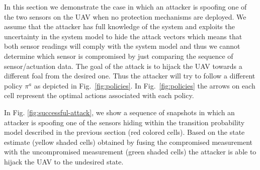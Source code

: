 \documentclass[letterpaper, 10 pt, conference]{ieeeconf}  %
\begin{document}
In this section we demonstrate the case in which an attacker is spoofing one of the two sensors on the UAV when no protection mechanisms are deployed. We assume that the attacker has full knowledge of the system and exploits the uncertainty in the system model to hide the attack vectors which means that both sensor readings will comply with the system model and thus we cannot determine which sensor is compromised by just comparing the sequence of sensor/actuation data. The goal of the attack is to hijack the UAV towards a different foal from the desired one. Thus the attacker will try to follow a different policy $\pi^a$ as depicted in Fig.~\ref{fig:policies}. In Fig.~\ref{fig:policies} the arrows on each cell represent the optimal actions associated with each policy.

In Fig. \ref{fig:successful-attack}, we show a sequence of snapshots in which an attacker is spoofing one of the sensors hiding within the transition probability model described in the previous section (red colored cells). Based on the state estimate (yellow shaded cells) obtained by fusing the compromised measurement with the uncompromised measurement (green shaded cells) the attacker is able to hijack the UAV to the undesired state.
\end{document}
